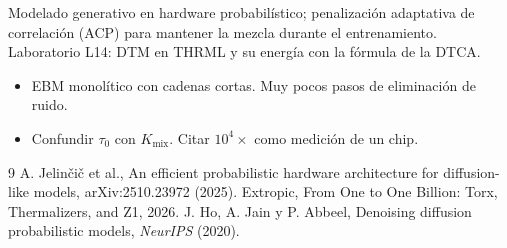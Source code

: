 \documentclass[11pt,a4paper]{article}
\begin{document}
\begin{aplicacion}
Modelado generativo en hardware probabilístico; penalización adaptativa de correlación (ACP) para mantener la mezcla durante el entrenamiento. Laboratorio L14: DTM en THRML
y su energía con la fórmula de la DTCA.
\end{aplicacion}

\begin{error}
\begin{itemize}[nosep]
\item EBM monolítico con cadenas cortas. \quad Muy pocos pasos de eliminación de ruido.
\item Confundir $\tau_0$ con $K_{\text{mix}}$. \quad Citar $10^4\times$ como medición de un chip.
\end{itemize}
\end{error}

\begin{thebibliography}{9}\small
{} A. Jelinčič et al., An efficient probabilistic hardware architecture for diffusion-like models, arXiv:2510.23972 (2025).
 Extropic, From One to One Billion: Torx, Thermalizers, and Z1, 2026.
 J. Ho, A. Jain y P. Abbeel, Denoising diffusion probabilistic models, \emph{NeurIPS} (2020).
\end{thebibliography}
\end{document}
